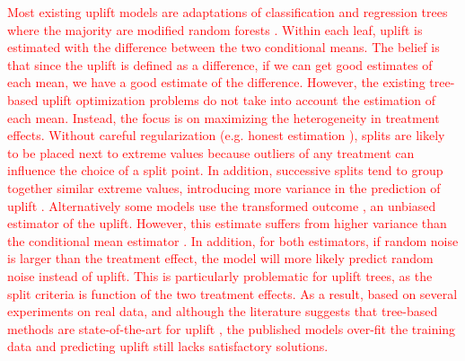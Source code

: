 \documentclass{article}
\begin{document}
\textcolor{red}{Most existing uplift models are adaptations of classification and regression trees \citep{breiman1984classification} where the majority are modified random forests \citep{Breiman-RandomForest-2001, radcliffe2011real, jaskowski2012uplift, guelman2012random}. Within each leaf, uplift is estimated with the difference between the two conditional means. The belief is that since the uplift is defined as a difference, if we can get good estimates of each mean, we have a good estimate of the difference. However, the existing tree-based uplift optimization problems do not take into account the estimation of each mean. Instead, the focus is on maximizing the heterogeneity in treatment effects. Without careful regularization (e.g. honest estimation \citep{athey2019generalized}), splits are likely to be placed next to extreme values because outliers of any treatment can influence the choice of a split point. In addition, successive splits tend to group together similar extreme values, introducing more variance in the prediction of uplift \citep{zhao2017practically}. Alternatively some models use the transformed outcome \citep{athey2015machine}, an unbiased estimator of the uplift. However, this estimate suffers from higher variance than the conditional mean estimator \citep{powers2018some}. In addition, for both estimators, if random noise is larger than the treatment effect, the model will more likely predict random noise instead of uplift. This is particularly problematic for uplift trees, as the split criteria is function of the two treatment effects. As a result, based on several experiments on real data, and although the literature suggests that tree-based methods are state-of-the-art for uplift \citep{soltys2015ensemble}, the published models over-fit the training data and predicting uplift still lacks satisfactory solutions.}
\end{document}
